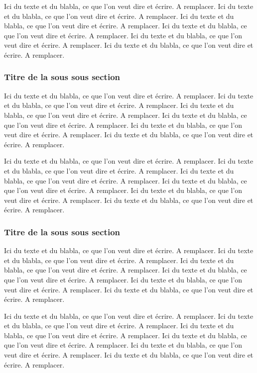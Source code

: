 Ici du texte et du blabla, ce que l'on veut dire et écrire. A remplacer. Ici du texte et du blabla, ce que l'on veut dire et écrire. A remplacer. Ici du texte et du blabla, ce que l'on veut dire et écrire. A remplacer. Ici du texte et du blabla, ce que l'on veut dire et écrire. A remplacer. Ici du texte et du blabla, ce que l'on veut dire et écrire. A remplacer. Ici du texte et du blabla, ce que l'on veut dire et écrire. A remplacer.

\subsubsection{Titre de la sous sous section}

Ici du texte et du blabla, ce que l'on veut dire et écrire. A remplacer. Ici du texte et du blabla, ce que l'on veut dire et écrire. A remplacer. Ici du texte et du blabla, ce que l'on veut dire et écrire. A remplacer. Ici du texte et du blabla, ce que l'on veut dire et écrire. A remplacer. Ici du texte et du blabla, ce que l'on veut dire et écrire. A remplacer. Ici du texte et du blabla, ce que l'on veut dire et écrire. A remplacer.

Ici du texte et du blabla, ce que l'on veut dire et écrire. A remplacer. Ici du texte et du blabla, ce que l'on veut dire et écrire. A remplacer. Ici du texte et du blabla, ce que l'on veut dire et écrire. A remplacer. Ici du texte et du blabla, ce que l'on veut dire et écrire. A remplacer. Ici du texte et du blabla, ce que l'on veut dire et écrire. A remplacer. Ici du texte et du blabla, ce que l'on veut dire et écrire. A remplacer.

\subsubsection{Titre de la sous sous section}

Ici du texte et du blabla, ce que l'on veut dire et écrire. A remplacer. Ici du texte et du blabla, ce que l'on veut dire et écrire. A remplacer. Ici du texte et du blabla, ce que l'on veut dire et écrire. A remplacer. Ici du texte et du blabla, ce que l'on veut dire et écrire. A remplacer. Ici du texte et du blabla, ce que l'on veut dire et écrire. A remplacer. Ici du texte et du blabla, ce que l'on veut dire et écrire. A remplacer.

Ici du texte et du blabla, ce que l'on veut dire et écrire. A remplacer. Ici du texte et du blabla, ce que l'on veut dire et écrire. A remplacer. Ici du texte et du blabla, ce que l'on veut dire et écrire. A remplacer. Ici du texte et du blabla, ce que l'on veut dire et écrire. A remplacer. Ici du texte et du blabla, ce que l'on veut dire et écrire. A remplacer. Ici du texte et du blabla, ce que l'on veut dire et écrire. A remplacer.


